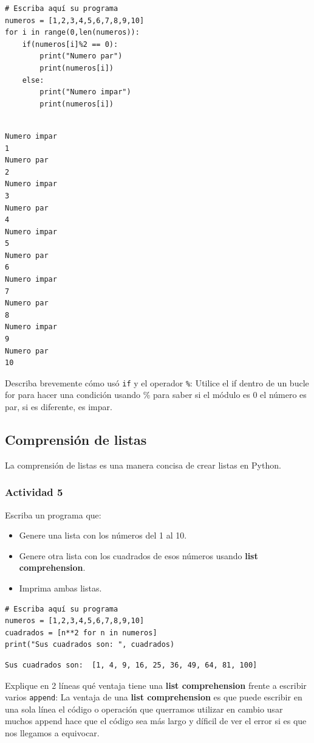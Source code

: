 \documentclass{article}
\begin{document}
\begin{verbatim}
# Escriba aquí su programa
numeros = [1,2,3,4,5,6,7,8,9,10]
for i in range(0,len(numeros)):
    if(numeros[i]%2 == 0):
        print("Numero par")
        print(numeros[i])
    else:
        print("Numero impar")
        print(numeros[i])
    
\end{verbatim}

\begin{verbatim}
Numero impar
1
Numero par
2
Numero impar
3
Numero par
4
Numero impar
5
Numero par
6
Numero impar
7
Numero par
8
Numero impar
9
Numero par
10
\end{verbatim}

Describa brevemente cómo usó \texttt{if} y el operador \texttt{\%}:
Utilice el if dentro de un bucle for para hacer una condición usando \% para saber si el módulo
es 0 el número es par, si es diferente, es impar.
\subsection{Comprensión de listas}
\label{sec:orged4fc63}
La comprensión de listas es una manera concisa de crear listas en Python.

\subsubsection{Actividad 5}
\label{sec:orgeecbf99}
Escriba un programa que:
\begin{itemize}
\item Genere una lista con los números del 1 al 10.
\item Genere otra lista con los cuadrados de esos números usando \textbf{list comprehension}.
\item Imprima ambas listas.
\end{itemize}

\begin{verbatim}
# Escriba aquí su programa
numeros = [1,2,3,4,5,6,7,8,9,10]
cuadrados = [n**2 for n in numeros]
print("Sus cuadrados son: ", cuadrados)
\end{verbatim}

\begin{verbatim}
Sus cuadrados son:  [1, 4, 9, 16, 25, 36, 49, 64, 81, 100]
\end{verbatim}


Explique en 2 líneas qué ventaja tiene una \textbf{list comprehension} frente a escribir varios \texttt{append}:
La ventaja de una \textbf{list comprehension} es que puede escribir en una sola línea el código o operación
que querramos utilizar en cambio usar muchos append hace que el código sea más largo y díficil de ver el error si es que nos llegamos a equivocar.
\end{document}
